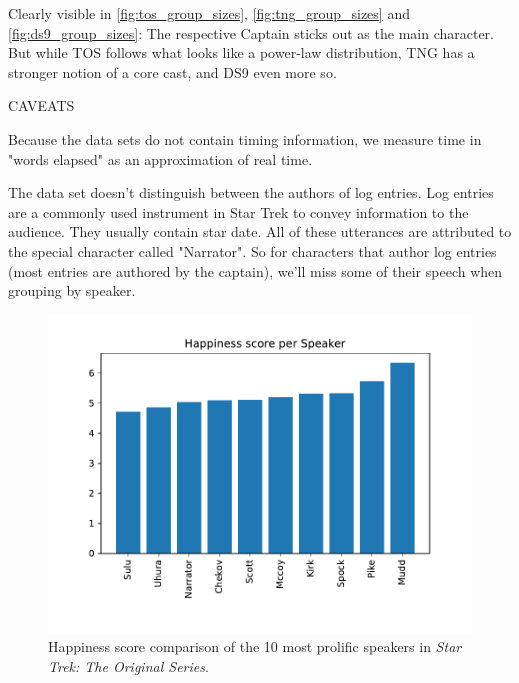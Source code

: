 Clearly visible in \ref{fig:tos_group_sizes}, \ref{fig:tng_group_sizes} and \ref{fig:ds9_group_sizes}: The respective Captain sticks out as the main character. But while TOS follows what looks like a power-law distribution, TNG has a stronger notion of a core cast, and DS9 even more so.

CAVEATS

Because the data sets do not contain timing information, we measure time in "words elapsed" as an approximation of real time.

The data set doesn't distinguish between the authors of log entries. Log entries are a commonly used instrument in Star Trek to convey information to the audience. They usually contain star date. All of these utterances are attributed to the special character called "Narrator". So for characters that author log entries (most entries are authored by the captain), we'll miss some of their speech when grouping by speaker.

\begin{figure}
  \centering
  \includegraphics[width=\columnwidth]{figures/localized/tos_happiness_scores.pdf}
  \caption{Happiness score comparison of the 10 most prolific speakers in \textit{Star Trek: The Original Series}.}
  \label{fig:tos_happiness}
\end{figure}

